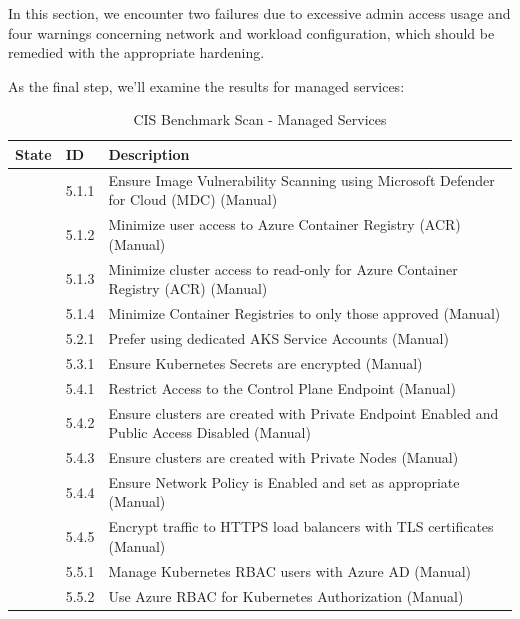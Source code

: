 In this section, we encounter two failures due to excessive admin access usage and four warnings concerning network and workload configuration, which should be remedied with the appropriate hardening.

\pagebreak

As the final step, we'll examine the results for managed services:

\begin{table}[hp]
  \centering
  \caption{CIS Benchmark Scan - Managed Services}
    \begin{tabular}{| l | l | p{11cm} |}
    \hline
    State & ID & Description \\
    \hline\hline
    [WARN] & 5.1.1 & Ensure Image Vulnerability Scanning using Microsoft Defender for Cloud (MDC) (Manual) \\
    \hline
    [WARN] & 5.1.2 & Minimize user access to Azure Container Registry (ACR) (Manual) \\
    \hline
    [WARN] & 5.1.3 & Minimize cluster access to read-only for Azure Container Registry (ACR) (Manual) \\
    \hline
    [WARN] & 5.1.4 & Minimize Container Registries to only those approved (Manual) \\
    \hline
    [WARN] & 5.2.1 & Prefer using dedicated AKS Service Accounts (Manual) \\
    \hline
    [WARN] & 5.3.1 & Ensure Kubernetes Secrets are encrypted (Manual) \\
    \hline
    [WARN] & 5.4.1 & Restrict Access to the Control Plane Endpoint (Manual) \\
    \hline
    [WARN] & 5.4.2 & Ensure clusters are created with Private Endpoint Enabled and Public Access Disabled (Manual) \\
    \hline
    [WARN] & 5.4.3 & Ensure clusters are created with Private Nodes (Manual) \\
    \hline
    [WARN] & 5.4.4 & Ensure Network Policy is Enabled and set as appropriate (Manual) \\
    \hline
    [WARN] & 5.4.5 & Encrypt traffic to HTTPS load balancers with TLS certificates (Manual) \\
    \hline
    [WARN] & 5.5.1 & Manage Kubernetes RBAC users with Azure AD (Manual) \\
    \hline
    [WARN] & 5.5.2 & Use Azure RBAC for Kubernetes Authorization (Manual) \\
    \hline
    \end{tabular}%
  \label{tab:aksScanM}%
\end{table}%

